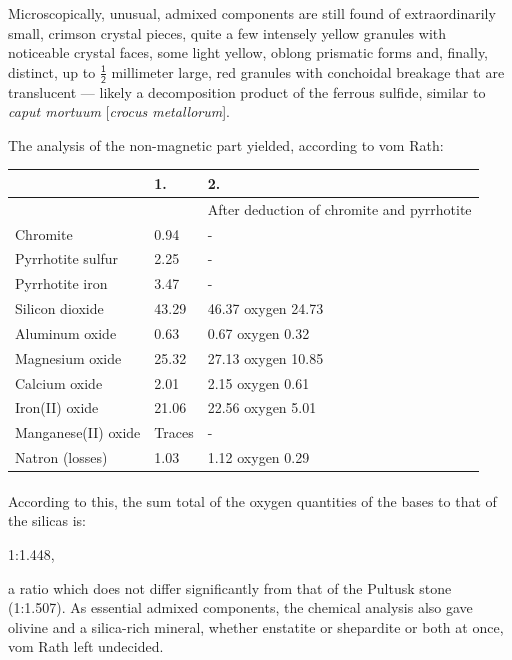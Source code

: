\documentclass[a4paper, 12pt, oneside]{article}
\begin{document}
Microscopically, unusual, admixed components are still found of extraordinarily small, crimson crystal pieces, quite a few intensely yellow granules with noticeable crystal faces, some light yellow, oblong prismatic forms and, finally, distinct, up to $\mathsf{\frac{1}{2}}$ millimeter large, red granules with conchoidal breakage that are translucent --- likely a decomposition product of the ferrous sulfide, similar to \emph{caput mortuum} [\emph{crocus metallorum}].

The analysis of the non-magnetic part yielded, according to vom Rath:
\begin{center}
    \begin{tabular}{ |l|p{1.4cm}|p{3.5cm}| }
        \hline
        & 1. & 2.\\\hline
        & & After deduction of chromite and pyrrhotite\\\hline
        Chromite & 0.94 & -\\\hline
        Pyrrhotite sulfur & 2.25 & -\\\hline
        Pyrrhotite iron & 3.47 & -\\\hline
        Silicon dioxide & 43.29 & 46.37 oxygen 24.73\\\hline
        Aluminum oxide & 0.63 & 0.67 oxygen 0.32\\\hline
        Magnesium oxide & 25.32 & 27.13 oxygen 10.85\\\hline
        Calcium oxide & 2.01 & 2.15 oxygen 0.61\\\hline
        Iron(II) oxide & 21.06 & 22.56 oxygen 5.01\\\hline
        Manganese(II) oxide & Traces & -\\\hline
        Natron (losses) & 1.03 & 1.12 oxygen 0.29\\
        \hline
    \end{tabular}
\end{center}
\paragraph*{}
According to this, the sum total of the oxygen quantities of the bases to that of the silicas is:

1:1.448,

a ratio which does not differ significantly from that of the Pultusk stone (1:1.507). As essential admixed components, the chemical analysis also gave olivine and a silica-rich mineral, whether enstatite or shepardite or both at once, vom Rath left undecided.
\end{document}
